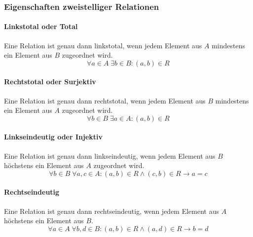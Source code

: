 \documentclass[../main.tex]{subfiles}
\begin{document}
            \subsubsection{Eigenschaften zweistelliger Relationen}
            	\paragraph{Linkstotal oder Total}
                    Eine Relation ist genau dann linkstotal, wenn jedem Element aus $A$ mindestens ein Element aus $B$ zugeordnet wird.
                    \begin{equation}
                        \forall a \in A\; \exists b \in B\colon \left(a, b\right) \in R
                    \end{equation}
                    
                \paragraph{Rechtstotal oder Surjektiv}
                    Eine Relation ist genau dann rechtstotal, wenn jedem Element aus $B$ mindestens ein Element aus $A$ zugeordnet wird.
                    \begin{equation}
                        \forall b \in B\; \exists a \in A\colon \left(a, b\right) \in R
                    \end{equation}
                    
                \paragraph{Linkseindeutig oder Injektiv}
	                Eine Relation ist genau dann linkseindeutig, wenn jedem Element aus $B$ höchstens ein Element aus $A$ zugeordnet wird.
                    \begin{equation}
                        \forall b \in B\; \forall a, c \in A\colon \left(a, b\right) \in R \wedge \left(c, b\right) \in R \rightarrow a = c
                    \end{equation}
                    
                \paragraph{Rechtseindeutig}
                    Eine Relation ist genau dann rechtseindeutig, wenn jedem Element aus $A$ höchstens ein Element aus $B$.
                    \begin{equation}
                        \forall a \in A\; \forall b, d \in B\colon \left(a, b\right) \in R \wedge \left(a, d\right) \in R \rightarrow b = d
                    \end{equation}
                    
\end{document}
